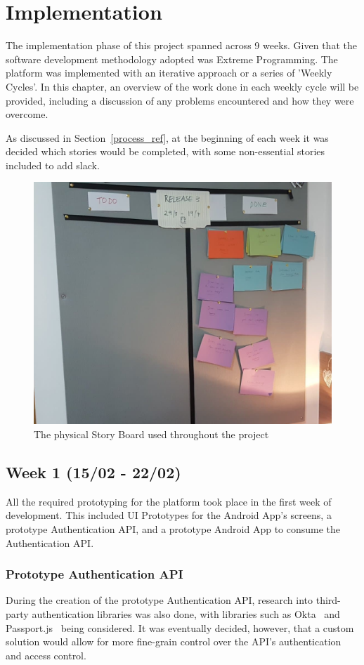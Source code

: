 \chapter{Implementation}
The implementation phase of this project spanned across 9 weeks. Given that the software development methodology adopted was Extreme Programming. The platform was implemented with an iterative approach or a series of 'Weekly Cycles'. In this chapter, an overview of the work done in each weekly cycle will be provided, including a discussion of any problems encountered and how they were overcome.

As discussed in Section~\ref{process_ref}, at the beginning of each week it was decided which stories would be completed, with some non-essential stories included to add slack.

\begin{figure}[!htb]
	\centering
	\includegraphics[width=0.5\linewidth]{Resources/img/story_board.jpg}
	\caption{The physical Story Board used throughout the project}
	\label{fig:story-board}
\end{figure}

\section{Week 1 (15/02 - 22/02)}
All the required prototyping for the platform took place in the first week of development. This included UI Prototypes for the Android App's screens, a prototype Authentication API, and a prototype Android App to consume the Authentication API.

\subsection{Prototype Authentication API}
During the creation of the prototype Authentication API, research into third-party authentication libraries was also done, with libraries such as Okta~\cite{okta_documentation_ref} and Passport.js~\cite{passport_documentation_ref} being considered. It was eventually decided, however, that a custom solution would allow for more fine-grain control over the API's authentication and access control.

